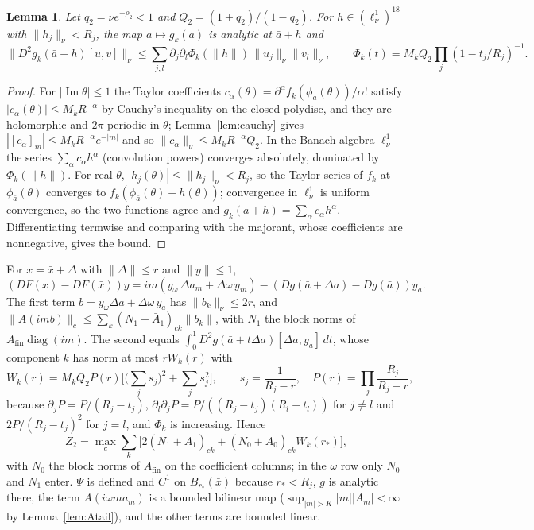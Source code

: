 \documentclass[11pt]{article}
\newtheorem{lemma}{Lemma}[section]
\theoremstyle{definition}
\newcommand{\im}{\operatorname{Im}}
\begin{document}
\begin{lemma}\label{lem:Z2}
Let $q_2 = \nu e^{-\rho_2} < 1$ and $Q_2 = (1 + q_2)/(1 - q_2)$. For $h \in (\ell^1_\nu)^{18}$ with $\|h_j\|_\nu < R_j$, the map $a \mapsto g_k(a)$ is analytic at $\bar a + h$ and
\[ \|D^2 g_k(\bar a + h)[u, v]\|_\nu \le \sum_{j,l}\partial_j\partial_l\Phi_k(\|h\|)\,\|u_j\|_\nu\|v_l\|_\nu, \qquad \Phi_k(t) = M_k Q_2\prod_j (1 - t_j/R_j)^{-1}. \]
\end{lemma}

\begin{proof}
For $|\im\theta| \le 1$ the Taylor coefficients $c_\alpha(\theta) = \partial^\alpha f_k(\phi_{\bar a}(\theta))/\alpha!$ satisfy $|c_\alpha(\theta)| \le M_k R^{-\alpha}$ by Cauchy's inequality on the closed polydisc, and they are holomorphic and $2\pi$-periodic in $\theta$; Lemma~\ref{lem:cauchy} gives $|[c_\alpha]_m| \le M_k R^{-\alpha}e^{-|m|}$ and so $\|c_\alpha\|_\nu \le M_k R^{-\alpha}Q_2$. In the Banach algebra $\ell^1_\nu$ the series $\sum_\alpha c_\alpha h^\alpha$ (convolution powers) converges absolutely, dominated by $\Phi_k(\|h\|)$. For real $\theta$, $|h_j(\theta)| \le \|h_j\|_\nu < R_j$, so the Taylor series of $f_k$ at $\phi_{\bar a}(\theta)$ converges to $f_k(\phi_{\bar a}(\theta) + h(\theta))$; convergence in $\ell^1_\nu$ is uniform convergence, so the two functions agree and $g_k(\bar a + h) = \sum_\alpha c_\alpha h^\alpha$. Differentiating termwise and comparing with the majorant, whose coefficients are nonnegative, gives the bound.
\end{proof}

For $x = \bar x + \Delta$ with $\|\Delta\| \le r$ and $\|y\| \le 1$,
\[ (DF(x) - DF(\bar x))y = im(y_\omega\,\Delta a_m + \Delta\omega\,y_m) - (Dg(\bar a + \Delta a) - Dg(\bar a))y_a. \]
The first term $b = y_\omega\Delta a + \Delta\omega\,y_a$ has $\|b_k\|_\nu \le 2r$, and $\|A(imb)\|_c \le \sum_k (N_1 + \bar A_1)_{ck}\|b_k\|$, with $N_1$ the block norms of $A_{\mathrm{fin}}\operatorname{diag}(im)$. The second equals $\int_0^1 D^2g(\bar a + t\Delta a)[\Delta a, y_a]\,dt$, whose component $k$ has norm at most $rW_k(r)$ with
\[ W_k(r) = M_kQ_2P(r)\Big[\Big(\sum_j s_j\Big)^2 + \sum_j s_j^2\Big], \qquad s_j = \frac{1}{R_j - r}, \quad P(r) = \prod_j\frac{R_j}{R_j - r}, \]
because $\partial_jP = P/(R_j - t_j)$, $\partial_l\partial_jP = P/((R_j - t_j)(R_l - t_l))$ for $j \ne l$ and $2P/(R_j - t_j)^2$ for $j = l$, and $\Phi_k$ is increasing. Hence
\[ Z_2 = \max_c\sum_k\big[2(N_1 + \bar A_1)_{ck} + (N_0 + \bar A_0)_{ck}W_k(r_*)\big], \]
with $N_0$ the block norms of $A_{\mathrm{fin}}$ on the coefficient columns; in the $\omega$ row only $N_0$ and $N_1$ enter. $\Psi$ is defined and $C^1$ on $B_{r_*}(\bar x)$ because $r_* < R_j$, $g$ is analytic there, the term $A(i\omega ma_m)$ is a bounded bilinear map ($\sup_{|m| > K}|m||A_m| < \infty$ by Lemma~\ref{lem:Atail}), and the other terms are bounded linear.
\end{document}
